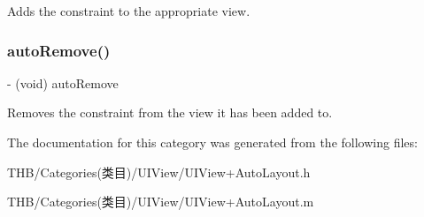Adds the constraint to the appropriate view. \mbox{\label{category_n_s_layout_constraint_07_auto_layout_08_a454e71cfa38480a628b2876d93bdad9a}} 
\subsubsection{\texorpdfstring{auto\+Remove()}{autoRemove()}}
{\footnotesize\ttfamily -\/ (void) auto\+Remove \begin{DoxyParamCaption}{ }\end{DoxyParamCaption}}

Removes the constraint from the view it has been added to. 

The documentation for this category was generated from the following files\+:\begin{DoxyCompactItemize}
\item 
T\+H\+B/\+Categories(类目)/\+U\+I\+View/U\+I\+View+\+Auto\+Layout.\+h\item 
T\+H\+B/\+Categories(类目)/\+U\+I\+View/U\+I\+View+\+Auto\+Layout.\+m\end{DoxyCompactItemize}
